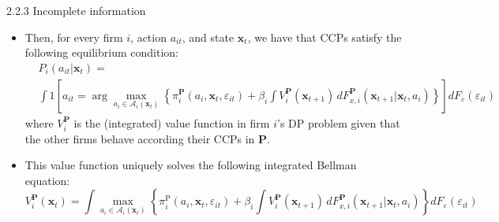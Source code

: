 \documentclass[aspectratio=169]{beamer}  %
\begin{document}
\begin{frame}
{2.2.3 Incomplete information}
    \begin{itemize}
        \item Then, for every firm \(i\), action $a_{it}$, and state $\mathbf{x}_t$, we have that CCPs satisfy the following equilibrium condition:
        \begin{equation}\label{}
            \begin{split}
            &P_i(a_{it}|\mathbf{x}_t) = \\
            &\int 1 \left[ a_{it} = \arg \max_{a_i \in \mathcal{A}_i(\mathbf{x}_t)} \left\{ \pi_i^\mathbf{P}(a_i, \mathbf{x}_t, \varepsilon_{it}) + \beta_i \int V_i^\mathbf{P}(\mathbf{x}_{t+1}) \, dF_{x,i}^\mathbf{P}(\mathbf{x}_{t+1}|\mathbf{x}_t, a_i) \right\} \right] dF_\varepsilon(\varepsilon_{it})
            \end{split}
        \end{equation}
        where $V_i^\mathbf{P}$ is the (integrated) value function in firm \(i\)’s DP problem given that the other firms behave according their CCPs in $\mathbf{P}$. 
        \item This value function uniquely solves the following integrated Bellman equation:
        \begin{equation}\label{}
            V_i^\mathbf{P}(\mathbf{x}_t) = \int \max_{a_i \in \mathcal{A}_i(\mathbf{x}_t)} \left\{ \pi_i^\text{P}(a_i, \mathbf{x}_t, \varepsilon_{it}) + \beta_i \int V_i^\mathbf{P}(\mathbf{x}_{t+1}) \, dF_{x,i}^\mathbf{P}(\mathbf{x}_{t+1}|\mathbf{x}_t, a_i) \right\} dF_\varepsilon(\varepsilon_{it})
        \end{equation}

    \end{itemize}
\end{frame}
\end{document}
